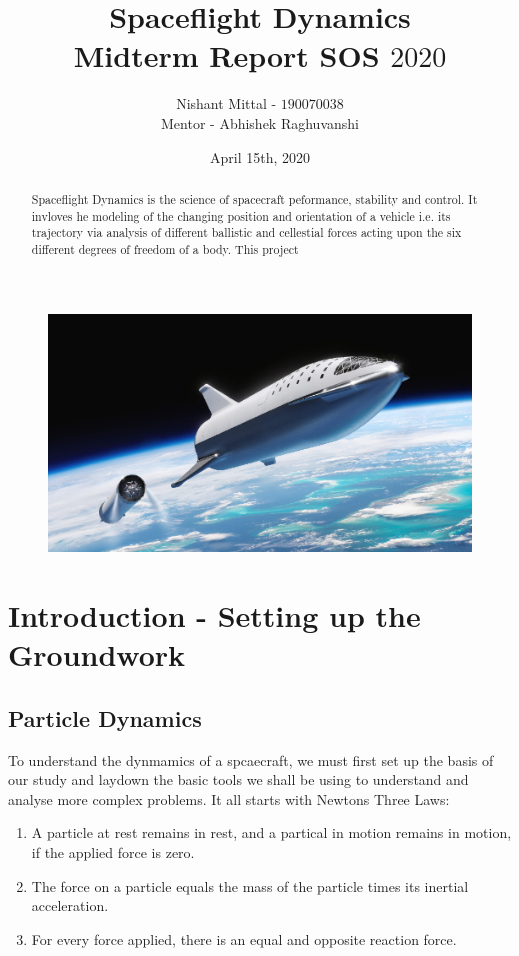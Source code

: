 \documentclass[12pt, letterpaper]{article}
\title{\textbf{\Huge{Spaceflight Dynamics}}\\ 
 		\large{Midterm Report SOS $2020$}}
\author{Nishant Mittal - $190070038$\\
Mentor - Abhishek Raghuvanshi}
\date{April 15th, 2020}
\begin{document}
\maketitle

\begin{figure}[h]
	\centering
    \includegraphics[width=\textwidth]{cover}
\end{figure}

\begin{abstract}
Spaceflight Dynamics is the science of spacecraft peformance, stability and control. It invloves he modeling of the changing position and orientation of a vehicle i.e. its trajectory via analysis of different ballistic and cellestial forces acting upon the six different degrees of freedom of a body. This project 
\end{abstract}
\setlength{\parindent}{0pt}
\newpage
\section{Introduction - Setting up the Groundwork}
\subsection{Particle Dynamics}
To understand the dynmamics of a spcaecraft, we must first set up the basis of our study and laydown the basic tools we shall be using to understand and analyse more complex problems. It all starts with Newtons Three Laws:
\begin{enumerate}

	\item A particle at rest remains in rest, and a partical in motion remains in motion, if the applied force is zero.
	\item The force on a particle equals the mass of the particle times its inertial acceleration.
	\item For every force applied, there is an equal and opposite reaction force.

\end{enumerate}
\end{document}

